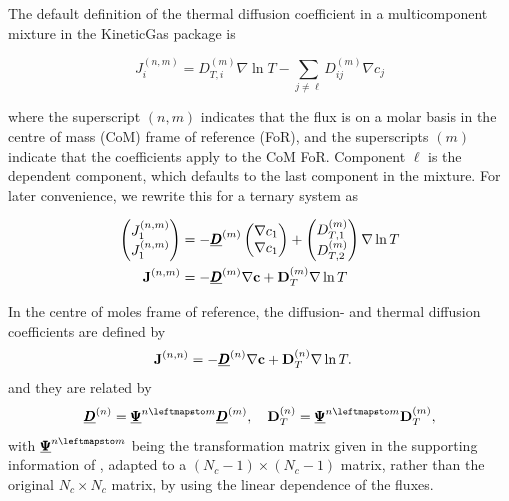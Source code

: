 The default definition of the thermal diffusion coefficient in a multicomponent mixture in the KineticGas package is

\begin{equation}
    J_i^{(n,m)} = D_{T,i}^{(m)} \nabla \ln T - \sum_{j \neq \ell} D_{ij}^{(m)} \nabla c_j
\end{equation}

where the superscript $(n, m)$ indicates that the flux is on a molar basis in the centre of mass (CoM) frame of reference (FoR), and the superscripts $(m)$ indicate that the coefficients apply to the CoM FoR. Component $\ell$ is the dependent component, which defaults to the last component in the mixture. For later convenience, we rewrite this for a ternary system as

\begin{equation}
    \begin{split}
        \begin{pmatrix}J_1^{(n,m)} \\ J_1^{(n,m)} \end{pmatrix} &= - \underline{\pmb{D}}^{(m)} \begin{pmatrix} \nabla c_1 \\ \nabla c_1 \end{pmatrix} + \begin{pmatrix} D_{T,1}^{(m)} \\ D_{T,2}^{(m)} \end{pmatrix} \nabla \ln T\\
        \boldsymbol{\mathrm{J}}^{(n, m)} &= - \underline{\pmb{D}}^{(m)} \nabla \boldsymbol{\mathrm{c}} + \boldsymbol{\mathrm{D}}_T^{(m)} \nabla \ln T
    \end{split}
    \label{eq:Dtm_def}
\end{equation}

In the centre of moles frame of reference, the diffusion- and thermal diffusion coefficients are defined by
\begin{equation}
    \begin{split}
        \boldsymbol{\mathrm{J}}^{(n, n)} &= - \underline{\pmb{D}}^{(n)} \nabla \boldsymbol{\mathrm{c}} + \boldsymbol{\mathrm{D}}_T^{(n)} \nabla \ln T.
    \end{split}
    \label{eq:DTn_def}
\end{equation}
and they are related by
\begin{equation}
    \Mat{D}^{(n)} = \Mat{\Psi}^{n \leftmapsto m} \Mat{D}^{(m)}, \quad \Vec{D}_T^{(n)} = \Mat{\Psi}^{n \leftmapsto m} \Vec{D}_T^{(m)},
\end{equation}
with $\Mat{\Psi}^{n \leftmapsto m}$ being the transformation matrix given in the supporting information of \cite{retmie}, adapted to a $(N_c - 1) \times (N_c - 1)$ matrix, rather than the original $N_c \times N_c$ matrix, by using the linear dependence of the fluxes.

